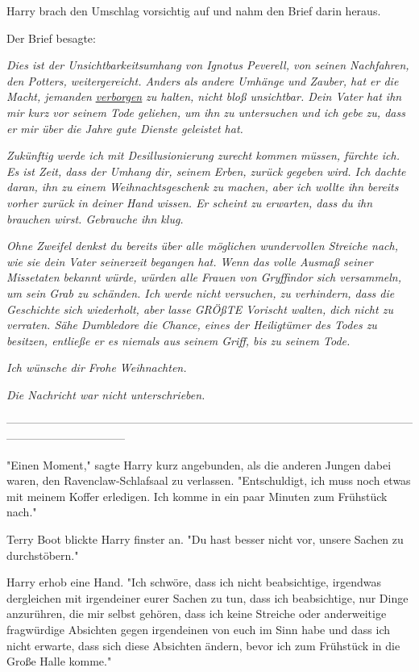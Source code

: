 {Harry brach den Umschlag vorsichtig auf und nahm den Brief darin heraus.

Der Brief besagte:

\emph{Dies ist der Unsichtbarkeitsumhang von Ignotus Peverell, von seinen Nachfahren, den Potters, weitergereicht. Anders als andere Umhänge und Zauber, hat er die Macht, jemanden} \emph{\uline{verborgen}} \emph{zu halten, nicht bloß unsichtbar. Dein Vater hat ihn mir kurz vor seinem Tode geliehen, um ihn zu untersuchen und ich gebe zu, dass er mir über die Jahre gute Dienste geleistet hat.}

\emph{Zukünftig werde ich mit Desillusionierung zurecht kommen müssen, fürchte ich. Es ist Zeit, dass der Umhang dir, seinem Erben, zurück gegeben wird. Ich dachte daran, ihn zu einem Weihnachtsgeschenk zu machen, aber ich wollte ihn bereits vorher zurück in deiner Hand wissen. Er scheint zu erwarten, dass du ihn brauchen wirst. Gebrauche ihn klug.}

\emph{Ohne Zweifel denkst du bereits über alle möglichen wundervollen Streiche nach, wie sie dein Vater seinerzeit begangen hat. Wenn das volle Ausmaß seiner Missetaten bekannt würde, würden alle Frauen von Gryffindor sich versammeln, um sein Grab zu schänden. Ich werde nicht versuchen, zu verhindern, dass die Geschichte sich wiederholt, aber lasse GRÖßTE Vorischt walten, dich nicht zu verraten. Sähe Dumbledore die Chance, eines der Heiligtümer des Todes zu besitzen, entließe er es niemals aus seinem Griff, bis zu seinem Tode.}

\emph{Ich wünsche dir Frohe Weihnachten.}

\emph{Die Nachricht war nicht unterschrieben.}

--------------------------------------------------------------------------------------------------------------------------------------------

"Einen Moment," sagte Harry kurz angebunden, als die anderen Jungen dabei waren, den Ravenclaw-Schlafsaal zu verlassen. "Entschuldigt, ich muss noch etwas mit meinem Koffer erledigen. Ich komme in ein paar Minuten zum Frühstück nach."

Terry Boot blickte Harry finster an. "Du hast besser nicht vor, unsere Sachen zu durchstöbern."

Harry erhob eine Hand. "Ich schwöre, dass ich nicht beabsichtige, irgendwas dergleichen mit irgendeiner eurer Sachen zu tun, dass ich beabsichtige, nur Dinge anzurühren, die mir selbst gehören, dass ich keine Streiche oder anderweitige fragwürdige Absichten gegen irgendeinen von euch im Sinn habe und dass ich nicht erwarte, dass sich diese Absichten ändern, bevor ich zum Frühstück in die Große Halle komme."

}
